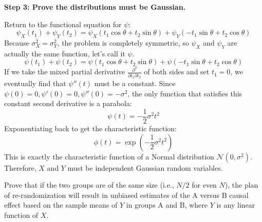 \begin{solution}
\textbf{Step 3: Prove the distributions must be Gaussian.}

Return to the functional equation for $\psi$:
\[ \psi_X(t_1) + \psi_Y(t_2) = \psi_X(t_1 \cos \theta + t_2 \sin \theta) + \psi_Y(-t_1 \sin \theta + t_2 \cos \theta) \]
Because $\sigma_X^2 = \sigma_Y^2$, the problem is completely symmetric, so $\psi_X$ and $\psi_Y$ are actually the same function, let's call it $\psi$.
\[ \psi(t_1) + \psi(t_2) = \psi(t_1 \cos \theta + t_2 \sin \theta) + \psi(-t_1 \sin \theta + t_2 \cos \theta) \]
If we take the mixed partial derivative $\frac{\partial^2}{\partial t_1 \partial t_2}$ of both sides and set $t_1 = 0$, we eventually find that $\psi''(t)$ must be a constant.
Since $\psi(0)=0, \psi'(0)=0, \psi''(0)=-\sigma^2$, the only function that satisfies this constant second derivative is a parabola:
\[ \psi(t) = -\frac{1}{2} \sigma^2 t^2 \]
Exponentiating back to get the characteristic function:
\[ \phi(t) = \exp\left(-\frac{1}{2} \sigma^2 t^2\right) \]
This is exactly the characteristic function of a Normal distribution $\mathcal{N}(0, \sigma^2)$. Therefore, $X$ and $Y$ must be independent Gaussian random variables.
\end{solution}


\begin{exercise}\label{probability:2020:5}
Prove that if the two groups are of the same size (i.e., $N/2$ for even $N$), the plan of re-randomization will result in unbiased estimates of the A versus B causal effect based on the sample means of $Y$ in groups A and B, where $Y$ is any linear function of $X$.
\end{exercise}


